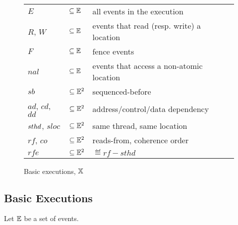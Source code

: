\begin{figure}[t]
\begin{tabular}{@{}l@{~}l@{~~~~~~~~}l}
$E$ & $\subseteq \mathbb{E}$ & all events in the execution \\
$R$, $W$ & $\subseteq \mathbb{E}$ & events that read (resp. write) a location \\
$F$ & $\subseteq \mathbb{E}$ & fence events \\
$nal$ & $\subseteq \mathbb{E}$ & events that access a non-atomic
location \\
$sb$ & $\subseteq \mathbb{E}^2$ & sequenced-before \\
$ad$, $cd$, $dd$ & $\subseteq \mathbb{E}^2$ & address/control/data dependency \\
$sthd$, $sloc$ & $\subseteq \mathbb{E}^2$ & same thread, same location \\
$rf$, $co$ & $\subseteq \mathbb{E}^2$ & reads-from, coherence order \\
$rfe$ & $\subseteq \mathbb{E}^2$ & $\eqdef rf - sthd$
\end{tabular}
\par\vspace*{-2mm}
\caption{Basic executions, $\mathbb{X}$}
\label{fig:basic_exec}
\end{figure}

\subsection{Basic Executions}
\label{sec:form_executions}
Let $\mathbb{E}$ be a set of events. 

